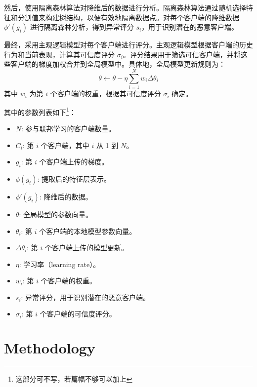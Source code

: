 \documentclass[conference]{IEEEtran}
\begin{document}
然后，使用隔离森林算法对降维后的数据进行分析。隔离森林算法通过随机选择特征和分割值来构建树结构，以便有效地隔离数据点。对每个客户端的降维数据 $\phi'(g_i)$ 进行隔离森林分析，得到异常评分 $s_i$，用于识别潜在的恶意客户端。

最终，采用主观逻辑模型对每个客户端进行评分。主观逻辑模型根据客户端的历史行为和当前表现，计算其可信度评分 $\sigma_i$。评分结果用于筛选可信客户端，并将这些客户端的梯度加权合并到全局模型中。具体地，全局模型更新规则为：
\[
\theta \leftarrow \theta - \eta \sum_{i=1}^N w_i \Delta \theta_i
\]
其中 $w_i$ 为第 $i$ 个客户端的权重，根据其可信度评分 $\sigma_i$ 确定。

其中的参数列表如下\footnote{这部分可不写，若篇幅不够可以加上}：

\begin{itemize}
    \item $N$: 参与联邦学习的客户端数量。
    \item $C_i$: 第 $i$ 个客户端，其中 $i$ 从 1 到 $N$。
    \item $g_i$: 第 $i$ 个客户端上传的梯度。
    \item $\phi(g_i)$: 提取后的特征层表示。
    \item $\phi'(g_i)$: 降维后的数据。
    \item $\theta$: 全局模型的参数向量。
    \item $\theta_i$: 第 $i$ 个客户端的本地模型参数向量。
    \item $\Delta \theta_i$: 第 $i$ 个客户端上传的模型更新。
    \item $\eta$: 学习率（learning rate）。
    \item $w_i$: 第 $i$ 个客户端的权重。
    \item $s_i$: 异常评分，用于识别潜在的恶意客户端。
    \item $\sigma_i$: 第 $i$ 个客户端的可信度评分。
\end{itemize}









\section{Methodology}
\label{sec:method}
\end{document}
